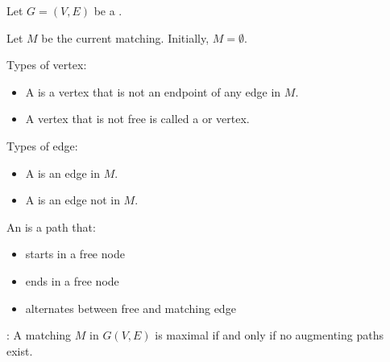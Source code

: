     \par Let $G = (V, E)$ be a .
    \par Let $M$ be the current matching. Initially, $M = \emptyset$.
    \par Types of vertex:
      \begin{itemize}
        \item A  is a vertex that is not an endpoint of any edge in $M$.
        \item A vertex that is not free is called a  or  vertex.
      \end{itemize}
    \par Types of edge:
      \begin{itemize}
        \item A  is an edge in $M$.
        \item A  is an edge not in $M$.
      \end{itemize}
    \par An  is a path that:
      \begin{itemize}
        \item starts in a free node
        \item ends in a free node
        \item alternates between free and matching edge
      \end{itemize}
    \par {}: A matching $M$ in $G(V,E)$ is maximal if and only if no augmenting paths exist. 
